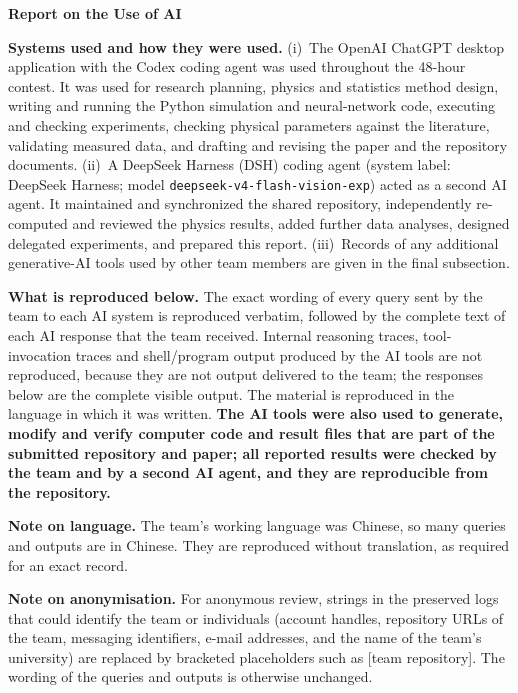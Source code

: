 \documentclass[UTF8,10pt]{ctexart}
\begin{document}
\begin{center}
{\Large\bfseries Report on the Use of AI}
\end{center}

\noindent\textbf{Systems used and how they were used.}
(i)~The OpenAI ChatGPT desktop application with the Codex coding agent was used throughout the 48-hour contest. It was used for research planning, physics and statistics method design, writing and running the Python simulation and neural-network code, executing and checking experiments, checking physical parameters against the literature, validating measured data, and drafting and revising the paper and the repository documents. (ii)~A DeepSeek Harness (DSH) coding agent (system label: DeepSeek Harness; model \texttt{deepseek-v4-flash-vision-exp}) acted as a second AI agent. It maintained and synchronized the shared repository, independently re-computed and reviewed the physics results, added further data analyses, designed delegated experiments, and prepared this report. (iii)~Records of any additional generative-AI tools used by other team members are given in the final subsection.

\noindent\textbf{What is reproduced below.}
The exact wording of every query sent by the team to each AI system is reproduced verbatim, followed by the complete text of each AI response that the team received. Internal reasoning traces, tool-invocation traces and shell/program output produced by the AI tools are not reproduced, because they are not output delivered to the team; the responses below are the complete visible output. The material is reproduced in the language in which it was written. \textbf{The AI tools were also used to generate, modify and verify computer code and result files that are part of the submitted repository and paper; all reported results were checked by the team and by a second AI agent, and they are reproducible from the repository.}

\noindent\textbf{Note on language.} The team's working language was Chinese, so many queries and outputs are in Chinese. They are reproduced without translation, as required for an exact record.

\noindent\textbf{Note on anonymisation.} For anonymous review, strings in the preserved logs that could identify the team or individuals (account handles, repository URLs of the team, messaging identifiers, e-mail addresses, and the name of the team's university) are replaced by bracketed placeholders such as [team repository]. The wording of the queries and outputs is otherwise unchanged.
\end{document}

